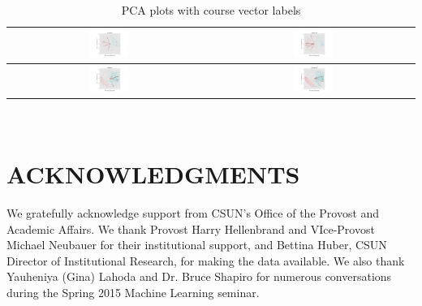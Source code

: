 \documentclass{sigchi}
\begin{document}
\begin{table}[h!]
 \begin{center}
   \begin{tabular}{| c | c |}

   \hline
   \includegraphics[width=0.2\textwidth]{figures/EconomicsPCA.png}
   &
   \includegraphics[width=0.2\textwidth]{figures/BusinessLawPCA.png}
   \\
   \hline
   \includegraphics[width=0.2\textwidth]{figures/MarketingPCA.png}
	&   
   \includegraphics[width=0.2\textwidth]{figures/ManagementPCA.png}
   \\
   \hline
   \end{tabular}
 \end{center}
 \caption{PCA plots with course vector labels}~\label{tab:pcaTable}
\end{table}

\section{ACKNOWLEDGMENTS}

We gratefully acknowledge support from CSUN’s Office of the Provost and Academic Affairs. We thank Provost Harry Hellenbrand and VIce-Provost Michael Neubauer for their institutional support, and Bettina Huber, CSUN Director of Institutional Research, for making the data available. We also thank Yauheniya (Gina) Lahoda and Dr. Bruce Shapiro for numerous conversations during the Spring 2015 Machine Learning seminar. 



\balance{}


\end{document}
